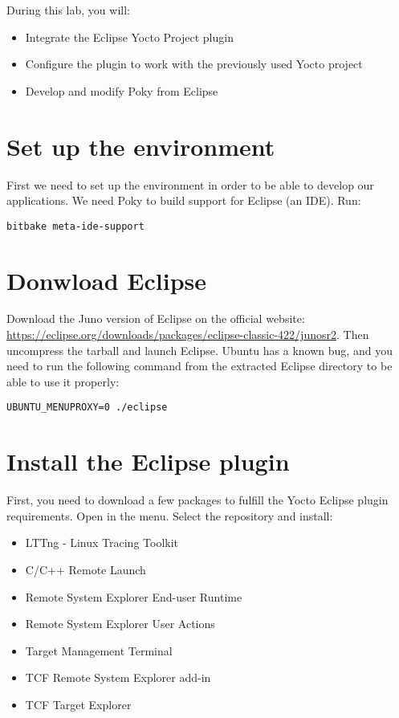 
During this lab, you will:
\begin{itemize}
  \item Integrate the Eclipse Yocto Project plugin
  \item Configure the plugin to work with the previously used Yocto project
  \item Develop and modify Poky from Eclipse
\end{itemize}

\section{Set up the environment}

First we need to set up the environment in order to be able to develop our
applications. We need Poky to build support for Eclipse (an IDE). Run:

\begin{verbatim}
bitbake meta-ide-support
\end{verbatim}

\section{Donwload Eclipse}

Download the Juno version of Eclipse on the official website:
\url{https://eclipse.org/downloads/packages/eclipse-classic-422/junosr2}.
Then uncompress the tarball and launch Eclipse. Ubuntu has a known bug, and
you need to run the following command from the extracted Eclipse directory to be
able to use it properly:
\begin{verbatim}
UBUNTU_MENUPROXY=0 ./eclipse
\end{verbatim}

\section{Install the Eclipse plugin}

First, you need to download a few packages to fulfill the Yocto
Eclipse plugin requirements. Open  in the
 menu. Select the  repository and install:
\begin{itemize}
  \item LTTng - Linux Tracing Toolkit
  \item C/C++ Remote Launch
  \item Remote System Explorer End-user Runtime
  \item Remote System Explorer User Actions
  \item Target Management Terminal
  \item TCF Remote System Explorer add-in
  \item TCF Target Explorer
\end{itemize}

